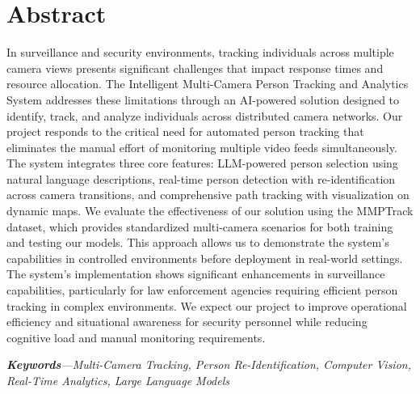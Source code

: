 \chapter*{Abstract}
\label{chap:abstract}

In surveillance and security environments, tracking individuals across multiple camera views presents significant challenges that impact response times and resource allocation. The Intelligent Multi-Camera Person Tracking and Analytics System addresses these limitations through an AI-powered solution designed to identify, track, and analyze individuals across distributed camera networks. Our project responds to the critical need for automated person tracking that eliminates the manual effort of monitoring multiple video feeds simultaneously. The system integrates three core features: LLM-powered person selection using natural language descriptions, real-time person detection with re-identification across camera transitions, and comprehensive path tracking with visualization on dynamic maps. We evaluate the effectiveness of our solution using the MMPTrack dataset, which provides standardized multi-camera scenarios for both training and testing our models. This approach allows us to demonstrate the system's capabilities in controlled environments before deployment in real-world settings. The system's implementation shows significant enhancements in surveillance capabilities, particularly for law enforcement agencies requiring efficient person tracking in complex environments. We expect our project to improve operational efficiency and situational awareness for security personnel while reducing cognitive load and manual monitoring requirements.

\par
\textit{\textbf{Keywords}---Multi-Camera Tracking, Person Re-Identification, Computer Vision, Real-Time Analytics, Large Language Models}
